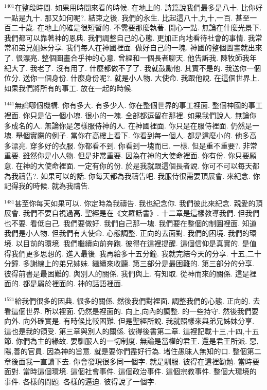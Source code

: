 \documentclass{book}
\begin{document}
$^{1401}$在整段時間.
如果用時間來看的時候.
在地上的.
詩篇說我們最多是八十.
比你好一點是九十.
那又如何呢?.
結束之後.
我們的永生.
比起這八十,九十,一百.
甚至一百二十歲.
在地上的確是很短暫的.
不需要那麼執著.
開心一點.
無論在什麼光景下.
我們都可以靠著神的恩典.
我們調整自己的心態.
更加正向地看待社會的事情.
我常常和弟兄姐妹分享.
我們每人在神國裡面.
做好自己的一塊.
神國的整個圖畫就出來了.
很漂亮.
整個圖畫合乎神的心意.
曾經和一個長者聊天.
他告訴我.
陳牧師我年紀大了.
我老了.
沒有用了.
什麼都做不了了.
我就鼓勵他.
其實不是的.
我送你一個位分.
送你一個身份.
什麼身份呢?.
就是小人物.
大使命.
我跟他說.
在這個世界上.
如果我們將所有的事工.
放在一起的時候.

$^{1441}$無論哪個機構.
你有多大.
有多少人.
你在整個世界的事工裡面.
整個神國的事工裡面.
你只是佔一個小塊.
很小的一塊.
全部都逗留在那裡.
如果我們說人.
無論你多成名的人.
無論你是怎樣服侍神的人.
在神國裡面.
你只是在服侍裡面.
仍然是一塊.
舉個實際的例子.
當你在高樓上看下.
你看到每一個人.
都是這麼小的.
他多高多漂亮.
穿多好的衣服.
你都看不到.
你看到一塊而已.
一樣.
但是重不重要?.
非常重要.
雖然你是小人物.
但是非常重要.
因為在神的大使命裡面.
你有份.
你只要願意.
在神的大使命裡面.
一定有你的份.
於是我就跟這個長者說.
你可不可以每天都為我禱告?.
如果可以的話.
你每天都為我禱告吧.
我服侍很需要頂展會.
來紀念.
你記得我的時候.
就為我禱告.

$^{1481}$甚至你每天如果可以.
你定時為我禱告.
我也紀念你.
我們彼此來紀念.
親愛的頂展會.
我們不要自視過高.
聖經是在《文羅話書》.
十二章是這樣教導我們.
但我們也不要.
看低自己.
我們要做好.
我們自己那一塊.
我們要在整個的制圖裡面.
知道我們是小人物.
但我們有大使命.
心態調整.
正向的去面對.
我們的困境.
我們的環境.
以目前的環境.
我們繼續向前奔跑.
彼得在這裡提醒.
這個信仰是真實的.
是值得我們更多思想的.
進入最後.
我再給多十五分鐘.
我就完結今天的分享.
十五,二十分鐘.
多謝線上的弟兄姊妹.
繼續來收聽.
第三部分是最困難的.
第三部分的分享.
彼得前書是最困難的.
與別人的關係.
我們與上.
有知取.
從神而來的關係.
這是裡面的.
都是屬於裡面的.
神的話語裡面.

$^{1521}$給我們很多的因典.
很多的關係.
然後我們對裡面.
調整我們的心態.
正向的.
去看這個世界.
所以裡面.
仍然是裡面的.
向上,向內的調整.
的一些持守.
然後我們要向外.
向外確實是.
有時候比較困難.
但是聖經所說.
我就照樣來與弟兄姊妹分享.
這也是我的領受.
第三章與別人的關係.
彼得後書第二章.
這裡記載十三,十四,十五節.
你們為主的緣故.
要馴服人的一切制度.
無論是當權的君王.
還是君王所派.
惡,陽,善的官員.
因為神的旨意.
就是要你們盡好行為.
堵住愚昧人無知的口.
整個第二章後面我一直讀下去.
你會發現很多同一個字.
就是馴服.
彼得在這裡勸勉.
當時要面對.
當時這個環境.
這個社會事件.
這個政治事件.
這個宗教事件.
整個大環境的事件.
各樣的問題.
各樣的逼迫.
彼得說了一個字.
\end{document}
